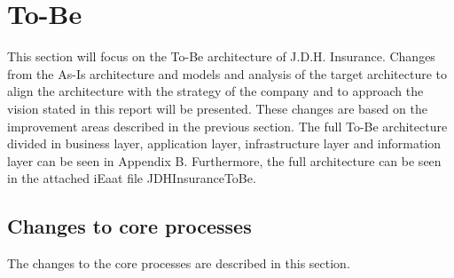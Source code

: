 \section{To-Be}
\label{sec:to_be}
This section will focus on the To-Be architecture of J.D.H. Insurance. Changes from the As-Is architecture and models and analysis of the target architecture to align the architecture with the strategy of the company and to approach the vision stated in this report will be presented. These changes are based on the improvement areas described in the previous section. The full To-Be architecture divided in business layer, application layer, infrastructure layer and information layer can be seen in Appendix B. Furthermore, the full architecture can be seen in the attached iEaat file JDHInsuranceToBe.
\subsection{Changes to core processes}
The changes to the core processes are described in this section.
